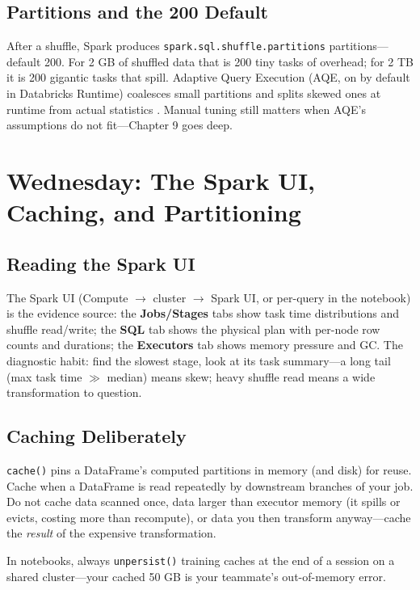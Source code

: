 \subsection{Partitions and the 200 Default}
After a shuffle, Spark produces \texttt{spark.sql.shuffle.partitions} partitions---default 200. For 2 GB of shuffled data that is 200 tiny tasks of overhead; for 2 TB it is 200 gigantic tasks that spill. Adaptive Query Execution (AQE, on by default in Databricks Runtime) coalesces small partitions and splits skewed ones at runtime from actual statistics \cite{sparkSQLTuning}. Manual tuning still matters when AQE's assumptions do not fit---Chapter 9 goes deep.

\section{Wednesday: The Spark UI, Caching, and Partitioning}
\subsection{Reading the Spark UI}
The Spark UI (Compute $\rightarrow$ cluster $\rightarrow$ Spark UI, or per-query in the notebook) is the evidence source: the \textbf{Jobs/Stages} tabs show task time distributions and shuffle read/write; the \textbf{SQL} tab shows the physical plan with per-node row counts and durations; the \textbf{Executors} tab shows memory pressure and GC. The diagnostic habit: find the slowest stage, look at its task summary---a long tail (max task time $\gg$ median) means skew; heavy shuffle read means a wide transformation to question.

\subsection{Caching Deliberately}
\texttt{cache()} pins a DataFrame's computed partitions in memory (and disk) for reuse. Cache when a DataFrame is read repeatedly by downstream branches of your job. Do not cache data scanned once, data larger than executor memory (it spills or evicts, costing more than recompute), or data you then transform anyway---cache the \emph{result} of the expensive transformation.

\begin{tipbox}
In notebooks, always \texttt{unpersist()} training caches at the end of a session on a shared cluster---your cached 50 GB is your teammate's out-of-memory error.
\end{tipbox}

